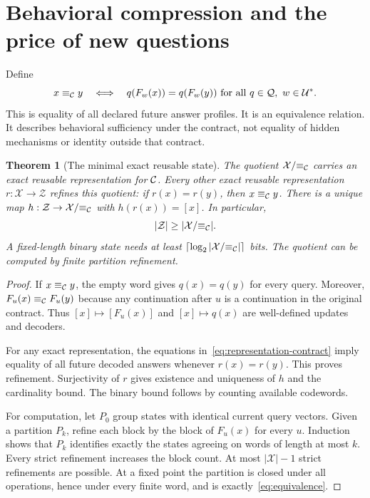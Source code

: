\documentclass[11pt,letterpaper]{article}
\theoremstyle{plain}
\newtheorem{theorem}{Theorem}[section]
\theoremstyle{definition}
\newcommand{\X}{\mathcal X}\newcommand{\Z}{\mathcal Z}
\newcommand{\U}{\mathcal U}\newcommand{\Q}{\mathcal Q}
\newcommand{\Eq}{\equiv_{\C}}\newcommand{\supp}{\operatorname{supp}}
\begin{document}
\section{Behavioral compression and the price of new questions}\label{sec:quotients}
Define
\begin{equation}\label{eq:equivalence}
x\Eq y\quad\Longleftrightarrow\quad q(F_w(x))=q(F_w(y))\ \text{for all }q\in\Q,\ w\in\U^*.
\end{equation}
This is equality of all declared future answer profiles. It is an equivalence relation. It describes behavioral sufficiency under the contract, not equality of hidden mechanisms or identity outside that contract.

\begin{theorem}[The minimal exact reusable state]\label{thm:quotient}
The quotient $\X/{\Eq}$ carries an exact reusable representation for $\mathcal C$. Every other exact reusable representation $r:\X\to\Z$ refines this quotient: if $r(x)=r(y)$, then $x\Eq y$. There is a unique map $h:\Z\to\X/{\Eq}$ with $h(r(x))=[x]$. In particular,
\[
|\Z|\geq|\X/{\Eq}|.
\]
A fixed-length binary state needs at least $\lceil\log_2|\X/{\Eq}|\rceil$ bits. The quotient can be computed by finite partition refinement.
\end{theorem}
\begin{proof}
If $x\Eq y$, the empty word gives $q(x)=q(y)$ for every query. Moreover, $F_u(x)\Eq F_u(y)$ because any continuation after $u$ is a continuation in the original contract. Thus $[x]\mapsto[F_u(x)]$ and $[x]\mapsto q(x)$ are well-defined updates and decoders.

For any exact representation, the equations in~\eqref{eq:representation-contract} imply equality of all future decoded answers whenever $r(x)=r(y)$. This proves refinement. Surjectivity of $r$ gives existence and uniqueness of $h$ and the cardinality bound. The binary bound follows by counting available codewords.

For computation, let $P_0$ group states with identical current query vectors. Given a partition $P_k$, refine each block by the block of $F_u(x)$ for every $u$. Induction shows that $P_k$ identifies exactly the states agreeing on words of length at most $k$. Every strict refinement increases the block count. At most $|\X|-1$ strict refinements are possible. At a fixed point the partition is closed under all operations, hence under every finite word, and is exactly~\eqref{eq:equivalence}.
\end{proof}
\end{document}
